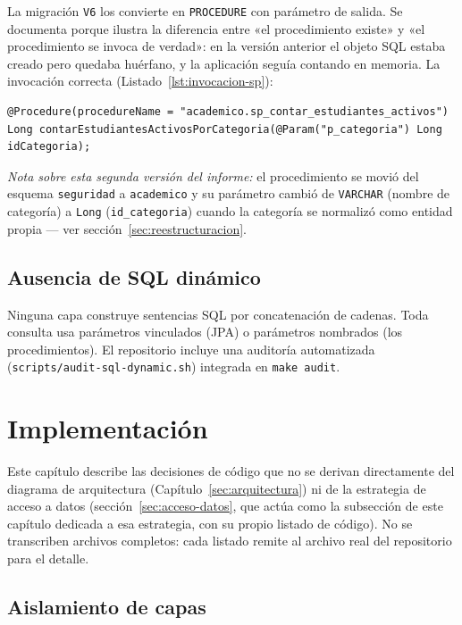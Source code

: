\documentclass[11pt,a4paper]{article}
\newcommand{\ruta}[1]{\texttt{\footnotesize #1}}
\begin{document}
La migración \texttt{V6} los convierte en \texttt{PROCEDURE} con parámetro de
salida. Se documenta porque ilustra la diferencia entre «el procedimiento
existe» y «el procedimiento se invoca de verdad»: en la versión anterior el
objeto SQL estaba creado pero quedaba huérfano, y la aplicación seguía
contando en memoria. La invocación correcta
(Listado~\ref{lst:invocacion-sp}):

\begin{lstlisting}[caption={Invocación real desde el repositorio (\ruta{academico/estudiante/repository/EstudianteRepository.java})},label={lst:invocacion-sp}]
@Procedure(procedureName = "academico.sp_contar_estudiantes_activos")
Long contarEstudiantesActivosPorCategoria(@Param("p_categoria") Long idCategoria);
\end{lstlisting}

\emph{Nota sobre esta segunda versión del informe:} el procedimiento se
movió del esquema \texttt{seguridad} a \texttt{academico} y su parámetro
cambió de \texttt{VARCHAR} (nombre de categoría) a \texttt{Long}
(\texttt{id\_categoria}) cuando la categoría se normalizó como entidad
propia — ver sección~\ref{sec:reestructuracion}.

\subsection{Ausencia de SQL dinámico}

Ninguna capa construye sentencias SQL por concatenación de cadenas. Toda
consulta usa parámetros vinculados (JPA) o parámetros nombrados (los
procedimientos). El repositorio incluye una auditoría automatizada
(\ruta{scripts/audit-sql-dynamic.sh}) integrada en \texttt{make audit}.

\section{Implementación}
\label{sec:implementacion}

Este capítulo describe las decisiones de código que no se derivan
directamente del diagrama de arquitectura (Capítulo~\ref{sec:arquitectura})
ni de la estrategia de acceso a datos (sección~\ref{sec:acceso-datos},
que actúa como la subsección de este capítulo dedicada a esa estrategia,
con su propio listado de código). No se transcriben archivos completos:
cada listado remite al archivo real del repositorio para el detalle.

\subsection{Aislamiento de capas}
\end{document}
